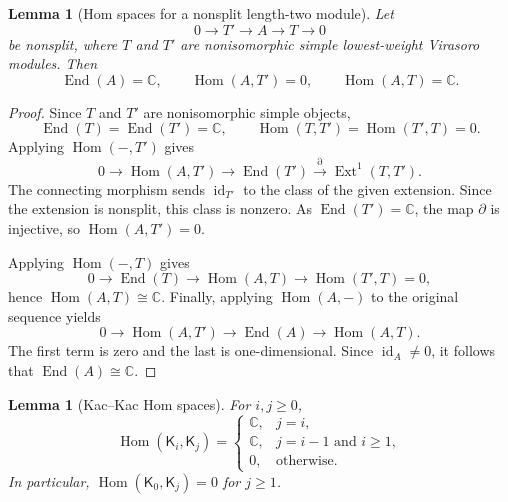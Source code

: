 \documentclass[12pt,leqno]{amsart}
\numberwithin{equation}{section}
\newtheorem{lem}[thm]{Lemma}
\newcommand{\End}{\operatorname{End}}
\newcommand{\Hom}{\operatorname{Hom}}
\newcommand{\Ext}{\operatorname{Ext}}
\newcommand{\id}{\operatorname{id}}
\def\C{\mathbb{C}}
\begin{document}
\begin{lem}[Hom spaces for a nonsplit length-two module]
\label{lem:length-two-Hom}
Let
\[
 0\longrightarrow T'\longrightarrow A\longrightarrow T\longrightarrow0
\]
be nonsplit, where $T$ and $T'$ are nonisomorphic simple lowest-weight
Virasoro modules.  Then
\begin{equation}\label{eq:length-two-Hom}
 \End(A)=\C,\qquad \Hom(A,T')=0,\qquad \Hom(A,T)=\C.
\end{equation}
\end{lem}

\begin{proof}
Since $T$ and $T'$ are nonisomorphic simple objects,
\[
 \End(T)=\End(T')=\C,\qquad
 \Hom(T,T')=\Hom(T',T)=0.
\]
Applying $\Hom(-,T')$ gives
\[
 0\longrightarrow\Hom(A,T')\longrightarrow\End(T')
 \xrightarrow{\partial}\Ext^1(T,T').
\]
The connecting morphism sends $\id_{T'}$ to the class of the given
extension.  Since the extension is nonsplit, this class is nonzero.  As
$\End(T')=\C$, the map $\partial$ is injective, so $\Hom(A,T')=0$.

Applying $\Hom(-,T)$ gives
\[
 0\longrightarrow\End(T)\longrightarrow\Hom(A,T)
 \longrightarrow\Hom(T',T)=0,
\]
hence $\Hom(A,T)\cong\C$.  Finally, applying $\Hom(A,-)$ to the original
sequence yields
\[
 0\longrightarrow\Hom(A,T')\longrightarrow\End(A)
 \longrightarrow\Hom(A,T).
\]
The first term is zero and the last is one-dimensional.  Since
$\id_A\ne0$, it follows that $\End(A)\cong\C$.
\end{proof}

\begin{lem}[Kac--Kac Hom spaces]\label{lem:Kac-Kac-Hom}
For $i,j\ge0$,
\[
 \Hom(\mathsf K_i,\mathsf K_j)=
 \begin{cases}
  \C,&j=i,\\
  \C,&j=i-1\text{ and }i\ge1,\\
  0,&\text{otherwise}.
 \end{cases}
\]
In particular, $\Hom(\mathsf K_0,\mathsf K_j)=0$ for $j\ge1$.
\end{lem}
\end{document}
